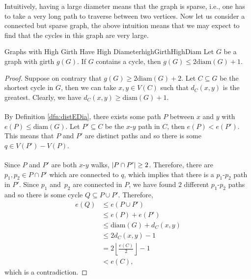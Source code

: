 \documentclass[math, code]{amznotes}
\theoremstyle{remark}
\begin{document}
Intuitively, having a large diameter means that the graph is sparse, i.e., one has to take a very long path to traverse between two vertices. Now let us consider a connected but sparse graph, the above intuition means that we may expect to find that the cycles in this graph are very large.
\begin{probox}{Graphs with High Girth Have High Diameter}{highGirthHighDiam}
    Let $G$ be a graph with girth $g(G)$. If $G$ contains a cycle, then $g(G) \leq 2\mathrm{diam}(G) + 1$.
    \tcblower
    \begin{proof}
        Suppose on contrary that $g(G) \geq 2\mathrm{diam}(G) + 2$. Let $C \subseteq G$ be the shortest cycle in $G$, then we can take $x, y \in V(C)$ such that $d_C(x, y)$ is the greatest. Clearly, we have $d_C(x, y) \geq \mathrm{diam}(G) + 1$.
        \\\\
        By Definition \ref{dfn:distEDia}, there exists some path $P$ between $x$ and $y$ with $e(P) \leq \mathrm{diam}(G)$. Let $P' \subseteq C$ be the $x$-$y$ path in $C$, then $e(P) < e(P')$. This means that $P$ and $P'$ are distinct paths and so there is some $q \in V(P') - V(P)$.
        \\\\
        Since $P$ and $P'$ are both $x$-$y$ walks, ${\left\lvert {P \cap P'} \right\rvert} \geq 2$. Therefore, there are $p_1, p_2 \in P \cap P'$ which are connected to $q$, which implies that there is a $p_1$-$p_2$ path in $P'$. Since $p_1$ and~$p_2$ are connected in $P$, we have found $2$ different $p_1$-$p_2$ paths and so there is some cycle $Q \subseteq P \cup P'$. Therefore,
        \begin{align*}
            e(Q) & \leq e(P\cup P') \\
            & \leq e(P) + e(P') \\
            & \leq \mathrm{diam}(G) + d_C(x, y) \\
            & \leq 2d_C(x, y) - 1 \\
            & = 2\left\lfloor\frac{e(C)}{2}\right\rfloor - 1 \\
            & < e(C),
        \end{align*}
        which is a contradiction.
    \end{proof}
\end{probox}
\end{document}
